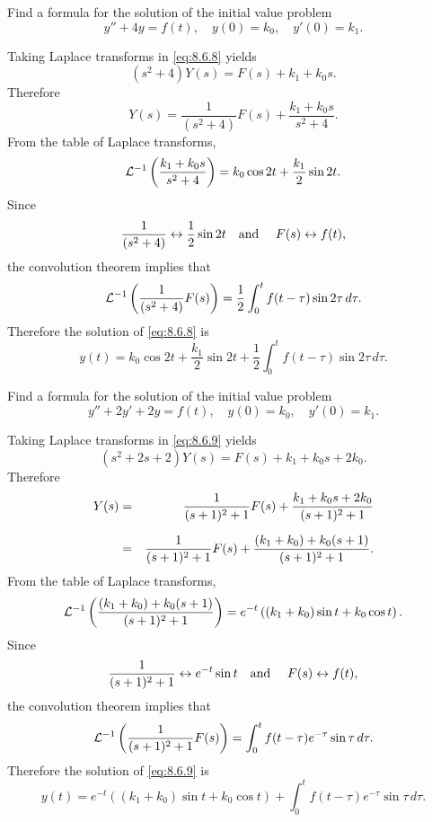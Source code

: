\setcounter{example}{2}
\setcounter{equation}{7}
\begin{example}
  \label{example:8.6.3}\rm Find a formula for the solution of the initial value problem
  \begin{equation}
    \label{eq:8.6.8}y''+4y=f(t),\quad y(0)=k_{0},\quad y'(0)=k_{1}.
  \end{equation}
\end{example}
\begin{examplesolution}
\solution Taking Laplace transforms in \eqref{eq:8.6.8} yields
\[
  (s^{2}+4)Y(s)=F(s)+k_{1}+k_{0}s.
\]
Therefore
\[
  Y(s)=\frac{1}{(s^{2}+4)}F(s)+\frac{k_{1}+k_{0}s}{s^{2}+4}.
\]
From the table of Laplace transforms,
\[
  {\cal L}^{-1}\left(\frac{k_{1}+k_{0}s}{s^{2}+4}\right)=k_{0}\cos2t+\frac{k_{1}}{2}\sin2t.
\]
Since
\[
  \frac{1}{(s^{2}+4)}\leftrightarrow\frac{1}{2}\sin2t\mbox{\quad and \quad}F(s)\leftrightarrow f(t),
\]
the convolution theorem implies that
\[
  {\cal L}^{-1}\left(\frac{1}{(s^{2}+4)}F(s)\right)= \frac{1}{2}\int_{0}^{t}f(t-\tau)\sin2\tau\, d\tau.
\]
Therefore the solution of \eqref{eq:8.6.8} is
\[
  y(t)=k_{0}\cos2t+\frac{k_{1}}{2}\sin2t+\frac{1}{2}\int_{0}^{t}f(t-\tau)\sin 2\tau\,d\tau.
\]
\end{examplesolution}

\setcounter{example}{3}
\setcounter{equation}{8}
\begin{example}
  \label{example:8.6.4}\rm Find a formula for the solution of the initial value problem
  \begin{equation}
    \label{eq:8.6.9}y''+2y'+2y=f(t),\quad y(0)=k_{0},\quad y'(0)=k_{1}.
  \end{equation}
\end{example}
\setcounter{equation}{9}
\begin{examplesolution}
\solution Taking Laplace transforms in \eqref{eq:8.6.9} yields
\[
  (s^{2}+2s+2)Y(s)=F(s)+k_{1}+k_{0}s+2k_{0}.
\]
Therefore
\begin{eqnarray*}
  Y(s) & = & \frac{1}{(s+1)^{2}+1}F(s)+\frac{k_{1}+k_{0}s+2k_{0}}{(s+1)^{2}+1} \\[2\jot]
       & = & \frac{1}{(s+1)^{2}+1}F(s)+\frac{(k_{1}+k_{0})+k_{0}(s+1)}{(s+1)^{2}+1}.
\end{eqnarray*}
From the table of Laplace transforms,
\[
  {\cal L}^{-1}\left(\frac{(k_{1}+k_{0})+k_{0}(s+1)}{(s+1)^{2}+1}\right)= e^{-t}\left((k_{1}+k_{0})\sin t+k_{0}\cos t\right).
\]
Since
\[
  \frac{1}{(s+1)^{2}+1}\leftrightarrow e^{-t}\sin t\mbox{\quad and \quad}F(s)\leftrightarrow f(t),
\]
the convolution theorem implies that
\[
  {\cal L}^{-1}\left(\frac{1}{(s+1)^{2}+1}F(s)\right)= \int_{0}^{t}f(t-\tau)e^{-\tau}\sin\tau \,d\tau.
\]
Therefore the solution of \eqref{eq:8.6.9} is
\begin{equation}
  \label{eq:8.6.10}y(t)=e^{-t}\left((k_{1}+k_{0})\sin t+k_{0}\cos t\right)+\int_{0}^{t}f(t-\tau)e^{-\tau}\sin\tau\,d\tau.
\end{equation}
\end{examplesolution}

